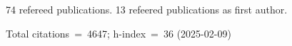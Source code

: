 74 refereed publications. 13 refeered publications as first author.

Total citations~=~4647; h-index~=~36 (2025-02-09)